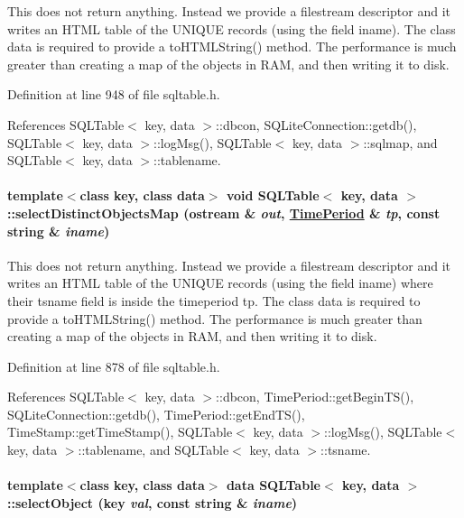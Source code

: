 This does not return anything. Instead we provide a filestream descriptor and it writes an HTML table of the UNIQUE records (using the field iname). The class data is required to provide a to\-HTMLString() method. The performance is much greater than creating a map of the objects in RAM, and then writing it to disk. 

Definition at line 948 of file sqltable.h.

References SQLTable$<$ key, data $>$::dbcon, SQLite\-Connection::getdb(), SQLTable$<$ key, data $>$::log\-Msg(), SQLTable$<$ key, data $>$::sqlmap, and SQLTable$<$ key, data $>$::tablename.\hypertarget{classSQLTable_SQLTablea16}{
\paragraph[selectDistinctObjectsMap]{\setlength{\rightskip}{0pt plus 5cm}template$<$class key, class data$>$ void SQLTable$<$ key, data $>$::select\-Distinct\-Objects\-Map (ostream \& {\em out}, \hyperlink{classTimePeriod}{Time\-Period} \& {\em tp}, const string \& {\em iname})}\hfill}
\label{classSQLTable_SQLTablea16}


This does not return anything. Instead we provide a filestream descriptor and it writes an HTML table of the UNIQUE records (using the field iname) where their tsname field is inside the timeperiod tp. The class data is required to provide a to\-HTMLString() method. The performance is much greater than creating a map of the objects in RAM, and then writing it to disk. 

Definition at line 878 of file sqltable.h.

References SQLTable$<$ key, data $>$::dbcon, Time\-Period::get\-Begin\-TS(), SQLite\-Connection::getdb(), Time\-Period::get\-End\-TS(), Time\-Stamp::get\-Time\-Stamp(), SQLTable$<$ key, data $>$::log\-Msg(), SQLTable$<$ key, data $>$::tablename, and SQLTable$<$ key, data $>$::tsname.\hypertarget{classSQLTable_SQLTablea8}{
\paragraph[selectObject]{\setlength{\rightskip}{0pt plus 5cm}template$<$class key, class data$>$ data SQLTable$<$ key, data $>$::select\-Object (key {\em val}, const string \& {\em iname})}\hfill}
\label{classSQLTable_SQLTablea8}


